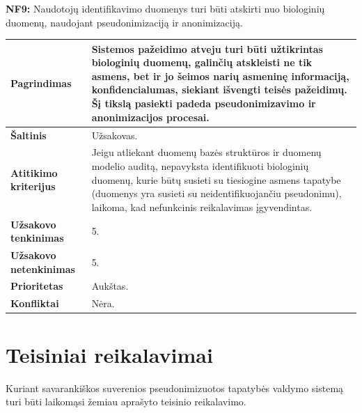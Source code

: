 \documentclass[12pt]{article}
\begin{document}
\noindent \textbf{NF9:} Naudotojų identifikavimo duomenys turi būti atskirti nuo
biologinių duomenų, naudojant pseudonimizaciją ir anonimizaciją.
\label{sec:NF9}
\begin{table}[htb!]
    \captionsetup{justification=centering}
    \vskip -10pt
    \begin{tabular}{|m{4.9cm}|m{11cm}|}
        \hline
        \raggedleft \textbf{\cellcolor{deepchampagne}Pagrindimas} &
        Sistemos pažeidimo atveju turi būti užtikrintas biologinių duomenų,
        galinčių atskleisti ne tik asmens, bet ir jo šeimos narių asmeninę
        informaciją, konfidencialumas, siekiant išvengti teisės pažeidimų. Šį
        tikslą pasiekti padeda pseudonimizavimo ir anonimizacijos procesai. \\
        \hline
        \raggedleft \textbf{\cellcolor{deepchampagne}Šaltinis} & Užsakovas. \\
        \hline
        \raggedleft \textbf{\cellcolor{deepchampagne}Atitikimo kriterijus} & 
        Jeigu atliekant duomenų bazės struktūros ir duomenų modelio auditą,
        nepavyksta identifikuoti biologinių duomenų, kurie būtų susieti su
        tiesiogine asmens tapatybe (duomenys yra susieti su neidentifikuojančiu
        pseudonimu), laikoma, kad nefunkcinis reikalavimas įgyvendintas. \\
        \hline
        \raggedleft \textbf{\cellcolor{deepchampagne}Užsakovo tenkinimas} & 5. \\
        \hline
        \raggedleft \textbf{\cellcolor{deepchampagne}Užsakovo netenkinimas} & 5. \\
        \hline
        \raggedleft \textbf{\cellcolor{deepchampagne}Prioritetas} & Aukštas. \\
        \hline
        \raggedleft \textbf{\cellcolor{deepchampagne}Konfliktai} & Nėra. \\
        \hline
    \end{tabular}
\end{table}

\newpage

\section{Teisiniai reikalavimai}
Kuriant savarankiškos suverenios pseudonimizuotos tapatybės valdymo sistemą
turi būti laikomąsi žemiau aprašyto teisinio reikalavimo.
\vskip 10pt
\end{document}
